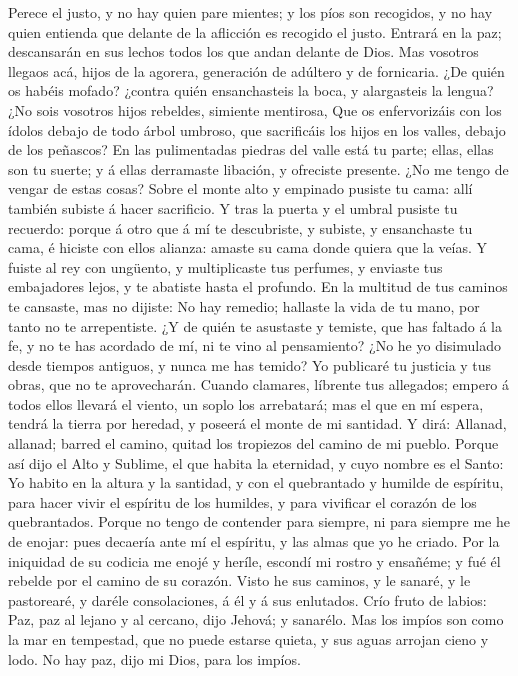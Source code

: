  Perece el justo, y no hay quien pare mientes; y los píos
son recogidos, y no hay quien entienda que delante de la aflicción es
recogido el justo.  Entrará en la paz; descansarán en sus
lechos todos los que andan delante de Dios.  Mas vosotros
llegaos acá, hijos de la agorera, generación de adúltero y de
fornicaria.  ¿De quién os habéis mofado? ¿contra quién
ensanchasteis la boca, y alargasteis la lengua? ¿No sois vosotros hijos
rebeldes, simiente mentirosa,  Que os enfervorizáis con
los ídolos debajo de todo árbol umbroso, que sacrificáis los hijos en
los valles, debajo de los peñascos?  En las pulimentadas
piedras del valle está tu parte; ellas, ellas son tu suerte; y á ellas
derramaste libación, y ofreciste presente. ¿No me tengo de vengar de
estas cosas?  Sobre el monte alto y empinado pusiste tu
cama: allí también subiste á hacer sacrificio.  Y tras la
puerta y el umbral pusiste tu recuerdo: porque á otro que á mí te
descubriste, y subiste, y ensanchaste tu cama, é hiciste con ellos
alianza: amaste su cama donde quiera que la veías.  Y
fuiste al rey con ungüento, y multiplicaste tus perfumes, y enviaste tus
embajadores lejos, y te abatiste hasta el profundo.  En
la multitud de tus caminos te cansaste, mas no dijiste: No hay remedio;
hallaste la vida de tu mano, por tanto no te arrepentiste.
 ¿Y de quién te asustaste y temiste, que has faltado á la
fe, y no te has acordado de mí, ni te vino al pensamiento? ¿No he yo
disimulado desde tiempos antiguos, y nunca me has temido?
 Yo publicaré tu justicia y tus obras, que no te
aprovecharán.  Cuando clamares, líbrente tus allegados;
empero á todos ellos llevará el viento, un soplo los arrebatará; mas el
que en mí espera, tendrá la tierra por heredad, y poseerá el monte de mi
santidad.  Y dirá: Allanad, allanad; barred el camino,
quitad los tropiezos del camino de mi pueblo.  Porque así
dijo el Alto y Sublime, el que habita la eternidad, y cuyo nombre es el
Santo: Yo habito en la altura y la santidad, y con el quebrantado y
humilde de espíritu, para hacer vivir el espíritu de los humildes, y
para vivificar el corazón de los quebrantados.  Porque no
tengo de contender para siempre, ni para siempre me he de enojar: pues
decaería ante mí el espíritu, y las almas que yo he criado.
 Por la iniquidad de su codicia me enojé y heríle,
escondí mi rostro y ensañéme; y fué él rebelde por el camino de su
corazón.  Visto he sus caminos, y le sanaré, y le
pastorearé, y daréle consolaciones, á él y á sus enlutados.
 Crío fruto de labios: Paz, paz al lejano y al cercano,
dijo Jehová; y sanarélo.  Mas los impíos son como la mar
en tempestad, que no puede estarse quieta, y sus aguas arrojan cieno y
lodo.  No hay paz, dijo mi Dios, para los impíos.


